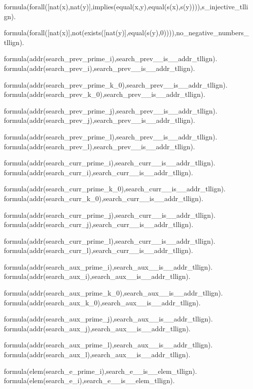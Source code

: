 
formula(forall([nat(x),nat(y)],implies(equal(x,y),equal(s(x),s(y)))),s\_injective\_tllign).

formula(forall([nat(x)],not(exists([nat(y)],equal(s(y),0)))),no\_negative\_numbers\_tllign).

formula(addr(search\_prev\_prime\_i),search\_prev\_\_is\_\_addr\_tllign).    formula(addr(search\_prev\_i),search\_prev\_\_is\_\_addr\_tllign).  

formula(addr(search\_prev\_prime\_k\_0),search\_prev\_\_is\_\_addr\_tllign).  formula(addr(search\_prev\_k\_0),search\_prev\_\_is\_\_addr\_tllign).    

formula(addr(search\_prev\_prime\_j),search\_prev\_\_is\_\_addr\_tllign).    formula(addr(search\_prev\_j),search\_prev\_\_is\_\_addr\_tllign).  

formula(addr(search\_prev\_prime\_l),search\_prev\_\_is\_\_addr\_tllign).    formula(addr(search\_prev\_l),search\_prev\_\_is\_\_addr\_tllign).  

formula(addr(search\_curr\_prime\_i),search\_curr\_\_is\_\_addr\_tllign).    formula(addr(search\_curr\_i),search\_curr\_\_is\_\_addr\_tllign).  

formula(addr(search\_curr\_prime\_k\_0),search\_curr\_\_is\_\_addr\_tllign).  formula(addr(search\_curr\_k\_0),search\_curr\_\_is\_\_addr\_tllign).    

formula(addr(search\_curr\_prime\_j),search\_curr\_\_is\_\_addr\_tllign).    formula(addr(search\_curr\_j),search\_curr\_\_is\_\_addr\_tllign).  

formula(addr(search\_curr\_prime\_l),search\_curr\_\_is\_\_addr\_tllign).    formula(addr(search\_curr\_l),search\_curr\_\_is\_\_addr\_tllign).  

formula(addr(search\_aux\_prime\_i),search\_aux\_\_is\_\_addr\_tllign).  formula(addr(search\_aux\_i),search\_aux\_\_is\_\_addr\_tllign).    

formula(addr(search\_aux\_prime\_k\_0),search\_aux\_\_is\_\_addr\_tllign).    formula(addr(search\_aux\_k\_0),search\_aux\_\_is\_\_addr\_tllign).  

formula(addr(search\_aux\_prime\_j),search\_aux\_\_is\_\_addr\_tllign).  formula(addr(search\_aux\_j),search\_aux\_\_is\_\_addr\_tllign).    

formula(addr(search\_aux\_prime\_l),search\_aux\_\_is\_\_addr\_tllign).  formula(addr(search\_aux\_l),search\_aux\_\_is\_\_addr\_tllign).    

formula(elem(search\_e\_prime\_i),search\_e\_\_is\_\_elem\_tllign).  formula(elem(search\_e\_i),search\_e\_\_is\_\_elem\_tllign).    

